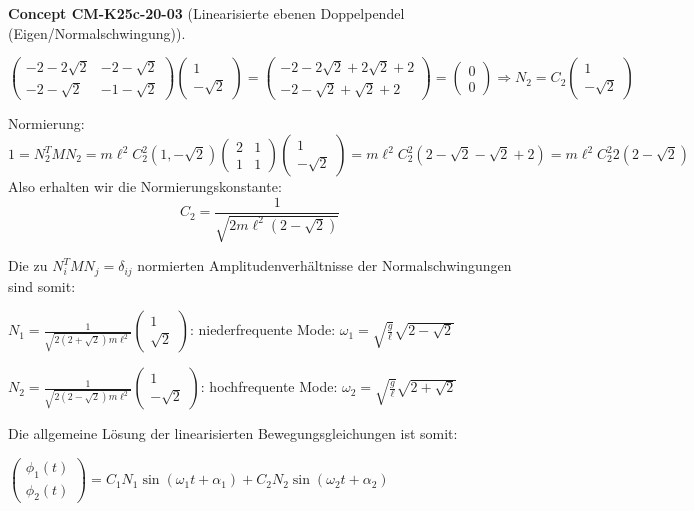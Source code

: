 \documentclass[10pt, letterpaper]{article}
\newcommand{\CustomHeading}[3]{%
  \par\medskip\noindent%
  \textbf{#1 #2} \textnormal{(#3)}.\enskip%
}
\newenvironment{CONC}[2]{\begin{unitbox}\CustomHeading{Concept}{#1}{#2}}{\end{unitbox}}
\begin{document}
\begin{CONC}{CM-K25c-20-03}{Linearisierte ebenen Doppelpendel (Eigen/Normalschwingung)}
$\begin{pmatrix}-2-2\sqrt{2} & -2-\sqrt{2} \\ -2-\sqrt{2} & -1-\sqrt{2}\end{pmatrix}\begin{pmatrix}1 \\ -\sqrt{2}\end{pmatrix} = \begin{pmatrix}-2-2\sqrt{2}+2\sqrt{2}+2 \\ -2-\sqrt{2}+\sqrt{2}+2\end{pmatrix} = \begin{pmatrix}0 \\ 0\end{pmatrix} \Rightarrow N_2 = C_2\begin{pmatrix}1 \\ -\sqrt{2}\end{pmatrix}$

Normierung:
$$1 = N_2^T M N_2 = m\ell^2 C_2^2(1,-\sqrt{2})\begin{pmatrix}2 & 1 \\ 1 & 1\end{pmatrix}\begin{pmatrix}1 \\ -\sqrt{2}\end{pmatrix} = m\ell^2 C_2^2(2-\sqrt{2}-\sqrt{2}+2) = m\ell^2 C_2^2 2(2-\sqrt{2})$$
Also erhalten wir die Normierungskonstante:
$$C_2 = \frac{1}{\sqrt{2m\ell^2(2-\sqrt{2})}}$$

Die zu $N_i^T M N_j = \delta_{ij}$ normierten Amplitudenverhältnisse der Normalschwingungen sind somit:

\begin{center}
$N_1 = \frac{1}{\sqrt{2(2+\sqrt{2})m\ell^2}}\begin{pmatrix}1 \\ \sqrt{2}\end{pmatrix}$: niederfrequente Mode: $\omega_1 = \sqrt{\frac{g}{\ell}}\sqrt{2-\sqrt{2}}$

$N_2 = \frac{1}{\sqrt{2(2-\sqrt{2})m\ell^2}}\begin{pmatrix}1 \\ -\sqrt{2}\end{pmatrix}$: hochfrequente Mode: $\omega_2 = \sqrt{\frac{g}{\ell}}\sqrt{2+\sqrt{2}}$
\end{center}

Die allgemeine Lösung der linearisierten Bewegungsgleichungen ist somit:

$\begin{pmatrix}\phi_1(t) \\ \phi_2(t)\end{pmatrix} = C_1 N_1 \sin(\omega_1t + \alpha_1) + C_2 N_2 \sin(\omega_2t + \alpha_2)$


\end{CONC}
\end{document}
